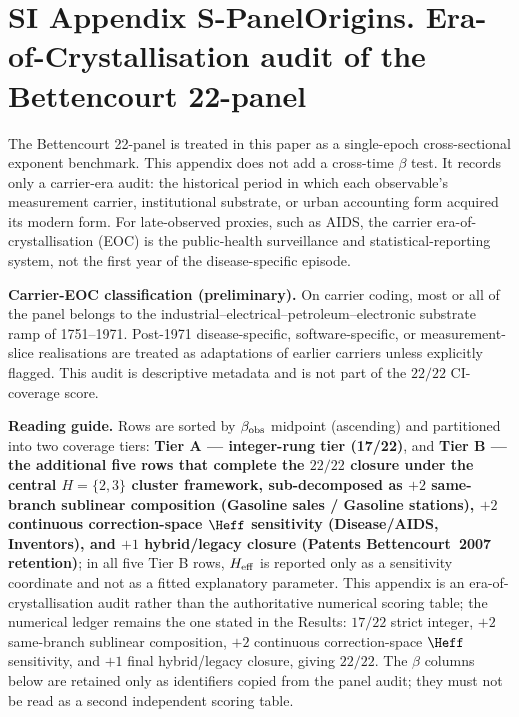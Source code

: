 
\section*{SI Appendix S-PanelOrigins. Era-of-Crystallisation audit of the Bettencourt 22-panel}\label{sec:S-PanelOrigins}

The Bettencourt 22-panel is treated in this paper as a single-epoch cross-sectional exponent benchmark. This appendix does not add a cross-time \(\beta\) test. It records only a carrier-era audit: the historical period in which each observable's measurement carrier, institutional substrate, or urban accounting form acquired its modern form. For late-observed proxies, such as AIDS, the carrier era-of-crystallisation (EOC) is the public-health surveillance and statistical-reporting system, not the first year of the disease-specific episode.

\textbf{Carrier-EOC classification (preliminary).} On carrier coding, most or all of the panel belongs to the industrial--electrical--petroleum--electronic substrate ramp of 1751--1971. Post-1971 disease-specific, software-specific, or measurement-slice realisations are treated as adaptations of earlier carriers unless explicitly flagged. This audit is descriptive metadata and is not part of the \(22/22\) CI-coverage score.

\textbf{Reading guide.} Rows are sorted by $\beta_{\rm obs}$ midpoint (ascending) and partitioned into two coverage tiers: \textbf{Tier A --- integer-rung tier (17/22)}, and \textbf{Tier B --- the additional five rows that complete the $22/22$ closure under the central $H{=}\{2,3\}$ cluster framework, sub-decomposed as $+2$ same-branch sublinear composition (Gasoline sales / Gasoline stations), $+2$ continuous correction-space $\Heff$ sensitivity (Disease/AIDS, Inventors), and $+1$ hybrid/legacy closure (Patents Bettencourt~2007 retention)}; in all five Tier B rows, $H_{\rm eff}$ is reported only as a sensitivity coordinate and not as a fitted explanatory parameter. This appendix is an era-of-crystallisation audit rather than the authoritative numerical scoring table; the numerical ledger remains the one stated in the Results: $17/22$ strict integer, $+2$ same-branch sublinear composition, $+2$ continuous correction-space $\Heff$ sensitivity, and $+1$ final hybrid/legacy closure, giving $22/22$. The $\beta$ columns below are retained only as identifiers copied from the panel audit; they must not be read as a second independent scoring table.

